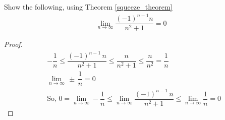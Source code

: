 \begin{exercise}
Show the following, using Theorem \ref{squeeze_theorem}
\begin{align*}
    \lim_{n \longrightarrow \infty} \dfrac{(-1)^{n-1}n}{n^{2}+1} = 0
\end{align*}
\begin{proof}
    \begin{align*}
        &-\dfrac{1}{n} \leq \dfrac{(-1)^{n-1} \hspace{2pt} n}{n^{2} + 1} \leq \dfrac{n}{n^{2} + 1} \leq \dfrac{n}{n^{2}} = \dfrac{1}{n}\\[2ex]
        &\lim_{n \longrightarrow \infty} \hspace{2pt} \pm \hspace{2pt} \dfrac{1}{n} = 0\\[2ex]
        &\text{So,} \hspace{4pt} 0 = \lim_{n \longrightarrow \infty} -\dfrac{1}{n} \leq \lim_{n \longrightarrow \infty} \dfrac{(-1)^{n-1} \hspace{2pt} n}{n^{2} + 1} \leq \lim_{n \longrightarrow \infty} \dfrac{1}{n} = 0
    \end{align*}
\end{proof}
\end{exercise}

